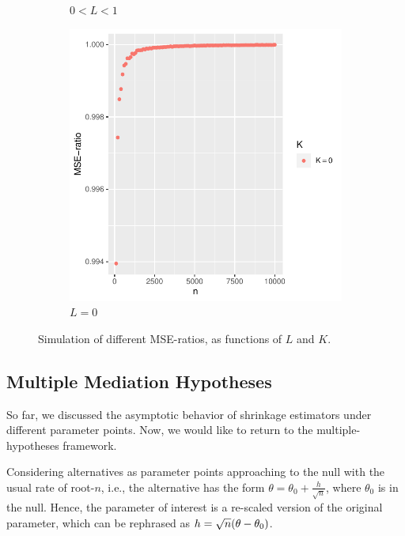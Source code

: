 \documentclass[ejs, twoside]{imsart}
\theoremstyle{plain}
\theoremstyle{remark}
\newcommand{\textrootn}{root-\(n\)}
\numberwithin{equation}{section}
\numberwithin{table}{section}
\numberwithin{figure}{section}
\let\originalleft\left
\let\originalright\right
\renewcommand{\left}{\mathopen{}\mathclose\bgroup\originalleft}
\renewcommand{\right}{\aftergroup\egroup\originalright}
\begin{document}
\begin{figure}
\begin{subfigure}{0.3\textwidth}
		\caption{\(0 < L < 1\)}
	\end{subfigure}
	\hfill
	\begin{subfigure}{0.3\textwidth}
		\includegraphics[width=\textwidth]{mseratio/mseratioc.pdf}
		\caption{\(L = 0\)}
	\end{subfigure}
	\caption[MSE-ratio illustration]{Simulation of different MSE-ratios, as functions of \(L\) and \(K\).}  \label{fig:casestudycases}
\end{figure}

\subsection{Multiple Mediation Hypotheses} \label{sec:la-multmedhyp}


So far, we discussed the asymptotic behavior of shrinkage estimators under different parameter points. Now, we would like to return to the multiple-hypotheses framework. 

Considering alternatives as parameter points approaching to the null with the usual rate of \textrootn, i.e., the alternative has the form \(\theta = \theta_0 + \frac{h}{\sqrt{n}}\), where \(\theta_0\) is in the null. Hence, the parameter of interest is a re-scaled version of the original parameter, which can be rephrased as \(h = \sqrt{n}\left(\theta-\theta_0 \right) \).
\end{document}

